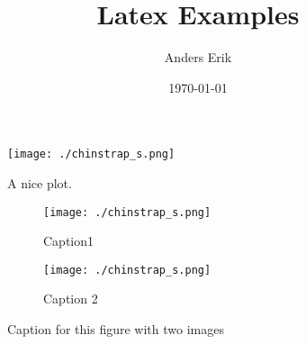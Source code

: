 \documentclass[12pt, letterpaper]{article}
\title{Latex Examples}
\author{Anders Erik}
\date{\today}
\begin{document}
\maketitle


\begin{figure}[H]
    \centering
    \texttt{[image: ./chinstrap\_s.png]}
    \caption{A nice plot.}
    \label{fig:mesh1}
\end{figure}


\begin{figure}[H]

\begin{subfigure}{0.1\textwidth}
\texttt{[image: ./chinstrap\_s.png]} 
\caption{Caption1}
\label{fig:subim1}
\end{subfigure}

\begin{subfigure}{0.4\textwidth}
\texttt{[image: ./chinstrap\_s.png]}
\caption{Caption 2}
\label{fig:subim2}
\end{subfigure}

\caption{Caption for this figure with two images}
\label{fig:image2}

\end{figure}
\end{document}
